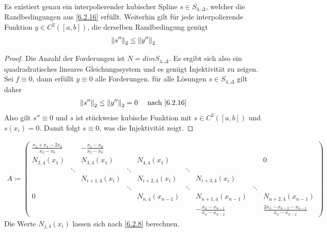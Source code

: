 \begin{Kore}\label{6.2.17}
  Es existiert genau ein interpolierender kubischer Spline 
  $s\in S_{4,\Delta}$, welcher die Randbedingungen aus \ref{6.2.16}
  erfüllt.
Weiterhin gilt für jede interpolierende Funktion $y\in C^2([a,b])$,
die derselben Randbedingung genügt
\begin{gather*}
  \left\| s'' \right\|_2 \leq \left\| y'' \right\|_2
\end{gather*}

\begin{proof}
  Die Anzahl der Forderungen ist $N=dim S_{4,\Delta}$.
  Es ergibt sich also ein quadradratisches lineares Gleichungssystem
und es genügt Injektivität zu zeigen.\\
Sei $f\equiv 0$, dann erfüllt $y\equiv 0$ alle Forderungen.
für alle Lösungen $s\in S_{4,\Delta}$ gilt daher
\begin{gather*}
  \left\| s'' \right\|_2\leq \left\| y'' \right\|_2 =0 \quad \text{ nach \ref{6.2.16}}
\end{gather*}
Also gilt $s''\equiv 0$ und $s$ ist stückweise kubische Funktion
mit $s\in C^2([a,b])$  und $s(x_i)=0$.
Damit folgt $s\equiv 0$, was die Injektivität zeigt.
\end{proof}
\end{Kore}



\label{5.2.18}
\begin{gather*}
A \coloneqq 
\left(\begin{array}{ccccccccc}
\frac{x_2+x_1-2x_0}{x_2-x_0}& & -\frac{x_1-x_0}{x_2-x_0}& && & & & \\
N_{2,4}(x_1)&&N_{3,4}(x_1) &&N_{4,4}(x_1)  & &&&0 \\
&\ddots & &\ddots& &\ddots &  &&\\
& & N_{i+1,4}(x_i)&& N_{i+2,4}(x_i) && N_{i+3,4}(x_i) && \\
& &  &\ddots& &\ddots &&\ddots  &\\
0&&&  &N_{n,4}(x_{n-1}) &&N_{n+1,4}(x_{n-1}) &&N_{n+2,4}(x_{n-1}) \\
& & && && -\frac{x_n-x_{n-1}}{x_n-x_{n-2}} && \frac{2
                                              x_n-x_{n-2}-x_{n-1}}{x_n-x_{n-2}}
\end{array}\right)
\end{gather*}
Die Werte $N_{j,4}(x_i)$ lassen sich nach \ref{6.2.8} berechnen.



